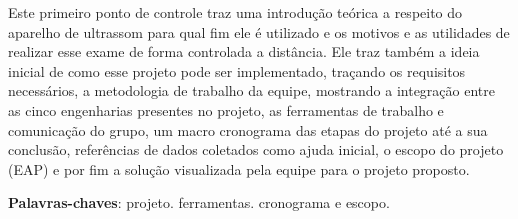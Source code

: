 \begin{resumo}
Este primeiro ponto de controle traz uma introdução teórica a respeito do aparelho de ultrassom para qual fim ele é utilizado e os motivos e as utilidades de realizar esse exame de forma controlada a distância. Ele traz também a ideia inicial de como esse projeto pode ser implementado, traçando os requisitos necessários, a metodologia de trabalho da equipe, mostrando a integração entre as cinco engenharias presentes no projeto, as ferramentas de trabalho e comunicação do grupo, um macro cronograma das etapas do projeto até a sua conclusão, referências de dados coletados como ajuda inicial, o escopo do projeto (EAP) e por fim a solução visualizada pela equipe para o projeto proposto.  

 \vspace{\onelineskip}
    
 \noindent
 \textbf{Palavras-chaves}: projeto. ferramentas. cronograma e escopo.
\end{resumo}
